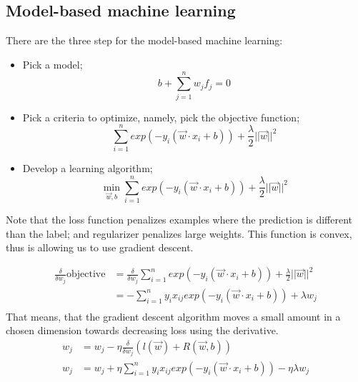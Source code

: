\subsection{Model-based machine learning}
There are the three step for the model-based machine learning:
\begin{itemize}
    \item Pick a model;
    \begin{equation}
        b + \sum_{j=1}^n w_jf_j = 0
    \end{equation}
    \item Pick a criteria to optimize, namely, pick the objective function;
    \begin{equation}
        \sum_{i=1}^n exp(-y_i(\vec{w} \cdot x_i + b)) + \frac \lambda 2 ||\vec{w}||^2
    \end{equation}
    \item Develop a learning algorithm;
    \begin{equation}
        \min_{\vec{w},b} \sum_{i=1}^n exp(-y_i(\vec{w} \cdot x_i + b)) + \frac \lambda 2 ||\vec{w}||^2
    \end{equation}
\end{itemize}
Note that the loss function penalizes examples where the prediction is different than the label; and regularizer penalizes large weights. This function is convex, thus is allowing us to use gradient descent.

\begin{align}
    \frac \delta {\delta w_j} \text{objective} &= \frac \delta {\delta w_j} \sum_{i=1}^n exp(-y_i(\vec{w} \cdot x_i + b))+ \frac \lambda 2 ||\vec{w}||^2\\
    &= -\sum_{i=1}^n y_i x_{ij} exp(-y_i(\vec{w} \cdot x_i + b)) + \lambda w_j\\
\end{align}
That means, that the gradient descent algorithm moves a small amount in a chosen dimension towards decreasing loss using the derivative.
\begin{align}
    w_j &= w_j - \eta \frac \delta {\delta w_j} (l(\vec{w}) + R(\vec{w},b))\\
    w_j &= w_j + \eta \sum_{i=1}^n y_i x_{ij} exp(-y_i(\vec{w} \cdot x_i + b)) - \eta \lambda w_j
\end{align}
